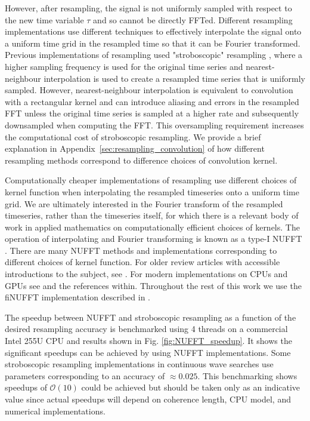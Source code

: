 \documentclass[aps,prd,amsmath,floats,floatfix, twocolumn,
superscriptaddress,nofootinbib,showpacs]{revtex4-2}
\begin{document}
However, after resampling, the signal is not uniformly sampled with respect to the new time variable $\tau$ and so cannot be directly FFTed. Different resampling implementations use different techniques to effectively interpolate the signal onto a uniform time grid in the resampled time so that it can be Fourier transformed. Previous implementations of resampling used "stroboscopic" resampling \cite{Jaranowski:1998qm, Astone:2010ct, Singhal:2019dfn}, where a higher sampling frequency is used for the original time series and nearest-neighbour interpolation is used to create a resampled time series that is uniformly sampled. However, nearest-neighbour interpolation is equivalent to convolution with a rectangular kernel and can introduce aliasing and errors in the resampled FFT unless the original time series is sampled at a higher rate and subsequently downsampled when computing the FFT. This oversampling requirement increases the computational cost of stroboscopic resampling. We provide a brief explanation in Appendix~\ref{sec:resampling_convolution} of how different resampling methods correspond to difference choices of convolution kernel.

Computationally cheaper implementations of resampling use different choices of kernel function when interpolating the resampled timeseries onto a uniform time grid. We are ultimately interested in the Fourier transform of the resampled timeseries, rather than the timeseries itself, for which there is a relevant body of work in applied mathematics on computationally efficient choices of kernels. The operation of interpolating and Fourier transforming is known as a type-I NUFFT \cite{duttFastFourierTransforms1993, Barnett:2019FINUFFT}. There are many NUFFT methods and implementations corresponding to different choices of kernel function. For older review articles with accessible introductions to the subject, see \cite{greengardAcceleratingNonuniformFast2004, wareFastApproximateFourier1998}. For modern implementations on CPUs and GPUs see \cite{finufftFlatironinstituteFinufftNonuniform, shihCuFINUFFTLoadbalancedGPU2021, linJyhmiinlinPynufft2023, vaillantGhisvailPyNFFT2023, vanderplasJakevdpNfft2023, ouGNUFFTWAutoTuningHighPerformance2017} and the references within. Throughout the rest of this work we use the fiNUFFT implementation described in \cite{2019SJSC...41C.479B}. 

The speedup between NUFFT and stroboscopic resampling as a function of the desired resampling accuracy is benchmarked using 4 threads on a commercial Intel 255U CPU and results shown in Fig. \ref{fig:NUFFT_speedup}. It shows the significant speedups can be achieved by using NUFFT implementations. Some stroboscopic resampling implementations in continuous wave searches use parameters corresponding to an accuracy of $\approx 0.025$. This benchmarking shows speedups of $\mathcal{O}(10)$ could be achieved but should be taken only as an indicative value since actual speedups will depend on coherence length, CPU model, and numerical implementations. 
\end{document}
